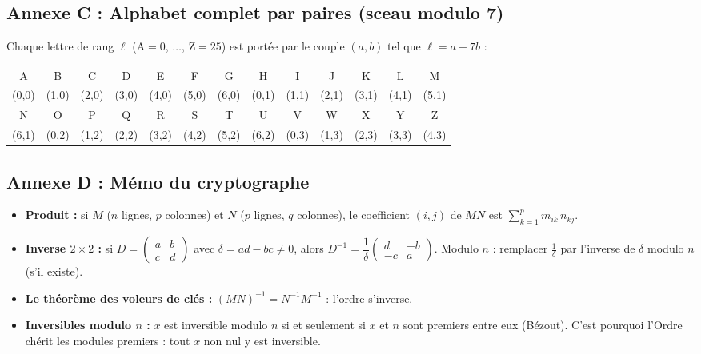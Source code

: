 \documentclass[11pt,a4paper]{article}
\begin{document}
	\subsection*{Annexe C : Alphabet complet par paires (sceau modulo 7)}
	Chaque lettre de rang $\ell$ ($\text{A}=0$, $\dots$, $\text{Z}=25$) est portée
	par le couple $(a,b)$ tel que $\ell = a + 7b$ :
	\begin{center}
		\begin{tabular}{*{13}{c}}
			\toprule
			A & B & C & D & E & F & G & H & I & J & K & L & M\\
			(0,0) & (1,0) & (2,0) & (3,0) & (4,0) & (5,0) & (6,0) & (0,1) & (1,1) & (2,1) & (3,1) & (4,1) & (5,1)\\
			\midrule
			N & O & P & Q & R & S & T & U & V & W & X & Y & Z\\
			(6,1) & (0,2) & (1,2) & (2,2) & (3,2) & (4,2) & (5,2) & (6,2) & (0,3) & (1,3) & (2,3) & (3,3) & (4,3)\\
			\bottomrule
		\end{tabular}
	\end{center}
	
	\subsection*{Annexe D : Mémo du cryptographe}
	\begin{itemize}
		\item \textbf{Produit :} si $M$ ($n$ lignes, $p$ colonnes) et $N$
		($p$ lignes, $q$ colonnes), le coefficient $(i,j)$ de $MN$ est
		$\sum_{k=1}^{p} m_{ik}\, n_{kj}$.
		\item \textbf{Inverse $2\times 2$ :} si $D = \begin{pmatrix}a&b\\c&d\end{pmatrix}$
		avec $\delta = ad-bc \neq 0$, alors
		$D^{-1} = \dfrac{1}{\delta}\begin{pmatrix}d&-b\\-c&a\end{pmatrix}$.
		Modulo $n$ : remplacer $\frac{1}{\delta}$ par l'inverse de $\delta$
		modulo $n$ (s'il existe).
		\item \textbf{Le théorème des voleurs de clés :}
		$(MN)^{-1} = N^{-1}M^{-1}$ : l'ordre s'inverse.
		\item \textbf{Inversibles modulo $n$ :} $x$ est inversible modulo $n$
		si et seulement si $x$ et $n$ sont premiers entre eux
		(Bézout). C'est pourquoi l'Ordre chérit les modules
		premiers : tout $x$ non nul y est inversible.
	\end{itemize}
	
\end{document}
